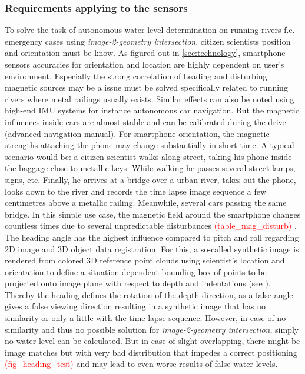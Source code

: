 \documentclass[review]{elsarticle}
\begin{document}
\subsubsection{Requirements applying to the sensors}
\label{sec:water_level_gauging_requirements_sensors}
To solve the task of autonomous water level determination on running rivers f.e. emergency cases using \textit{image-2-geometry intersection}, citizen scientists position and orientation must be know. As figured out in \ref{sec:technology}, smartphone sensors accuracies for orientation and location are highly dependent on user's environment. Especially the strong correlation of heading and disturbing magnetic sources may be a issue must be solved specifically related to running rivers where metal railings usually exists. Similar effects can also be noted using high-end IMU systems for instance autonomous car navigation. But the magnetic influences inside cars are almost stable and can be calibrated during the drive (advanced navigation manual). For smartphone orientation, the magnetic strengths attaching the phone may change substantially in short time. A typical scenario would be: a citizen scientist walks along street, taking his phone inside the baggage close to metallic keys. While walking he passes several street lamps, signs, etc. Finally, he arrives at a bridge over a urban river, takes out the phone, looks down to the river and records the time lapse image sequence a few centimetres above a metallic railing. Meanwhile, several cars passing the same bridge. In this simple use case, the magnetic field around the smartphone changes countless times due to several unpredictable disturbances \textcolor{red}{(table_mag_disturb)} \cite{Blum2013}.
\\The heading angle has the highest influence compared to pitch and roll regarding 2D image and 3D object data registration. For this, a so-called synthetic image is rendered from colored 3D reference point clouds using scientist's location and orientation to define a situation-dependent bounding box of points to be projected onto image plane with respect to depth and indentations (see \cite{Boerner2016}). Thereby the heading defines the rotation of the depth direction, as a false angle gives a false viewing direction resulting in a synthetic image that has no similarity or only a little with the time lapse sequence. However, in case of no similarity and thus no possible solution for \textit{image-2-geometry intersection}, simply no water level can be calculated. But in case of slight overlapping, there might be image matches but with very bad distribution that impedes a correct positioning \textcolor{red}{(fig_heading_test)} and may lead to even worse results of false water levels.
\end{document}
